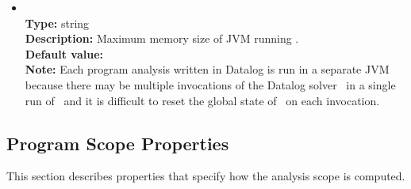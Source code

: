 \begin{itemize}
\item
{} \\
{\bf Type:} string \\
{\bf Description:} Maximum memory size of JVM running \bddbddb. \\
{\bf Default value:}  \\
{\bf Note:} Each program analysis written in Datalog is run in a separate JVM because there may be multiple invocations of the Datalog solver \bddbddb\ in a single run of \Chord\ and it is difficult to reset the global state of \bddbddb\ on each invocation.
\end{itemize}

\subsection{Program Scope Properties}

This section describes properties that specify how the analysis scope is computed.

